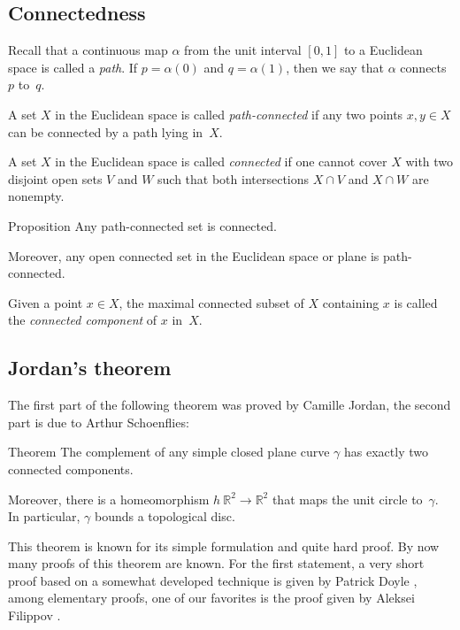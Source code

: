 \subsection*{Connectedness}

Recall that a continuous map $\alpha$ from the unit interval $[0,1]$ to a Euclidean space is called a \emph{path}.
If $p=\alpha (0)$ and $q = \alpha (1)$, then we say that $\alpha$ connects $p$ to~$q$.


A set $X$ in the Euclidean space is called \emph{path-connected} if any two points $x,y\in X$ can be connected by a path lying in~$X$.

A set $X$ in the Euclidean space is called \emph{connected} if one cannot cover $X$ with two disjoint open sets $V$ and $W$ such that both intersections $X\cap V$ and $X\cap W$ are nonempty.

\begin{thm}{Proposition}
Any path-connected set is connected.

Moreover, any open connected set in the Euclidean space or plane is path-connected.
\end{thm}

Given a point $x\in X$, the maximal connected subset of $X$ containing $x$ is called the \emph{connected component} of $x$ in~$X$.

\subsection*{Jordan's theorem}

The first part of the following theorem was proved by Camille Jordan, the second part is due to Arthur Schoenflies:

\begin{thm}{Theorem}\label{thm:jordan}
The complement of any simple closed plane curve $\gamma$ has exactly two connected components. 

Moreover, there is a homeomorphism $h\:\mathbb{R}^2\to \mathbb{R}^2$ that maps the unit circle to~$\gamma$.
In particular, $\gamma$ bounds a topological disc.
\end{thm}

This theorem is known for its simple formulation and quite hard proof.
By now many proofs of this theorem are known.
For the first statement, a very short proof based on a somewhat developed technique is given by Patrick Doyle \cite{doyle},
among elementary proofs, one of our favorites is the proof given by Aleksei Filippov \cite{filippov}.

